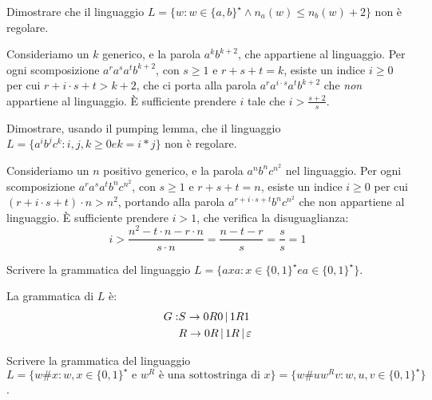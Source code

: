 \begin{esercizio}
Dimostrare che il linguaggio $L = \{ w : w \in \{a,b\}^{\star} \land n_a(w) \le n_b(w) + 2 \}$ non \`e regolare.
\end{esercizio}

Consideriamo un $k$ generico, e la parola $a^k b^{k+2}$, che appartiene al linguaggio.
Per ogni scomposizione $a^r a^s a^t b^{k+2}$, con $s \ge 1$ e $r + s + t = k$, esiste un indice $i \ge 0$ per cui $r + i \cdot s + t > k + 2$, che ci porta alla parola $a^r a^{i \cdot s} a^t b^{k+2}$ che \emph{non} appartiene al linguaggio.
\`E sufficiente prendere $i$ tale che $i > \frac{s + 2}{s}$.

\begin{esercizio}
Dimostrare, usando il pumping lemma, che il linguaggio $L = \{ a^i b^j c^k : i,j,k \ge 0 e k = i * j \}$ non \`e regolare.
\end{esercizio}

Consideriamo un $n$ positivo generico, e la parola $a^n b^n c^{n^2}$ nel linguaggio.
Per ogni scomposizione $a^r a^s a^t b^n c^{n^2}$, con $s \ge 1$ e $r + s + t = n$, esiste un indice $i \ge 0$ per cui $(r + i \cdot s + t) \cdot n > n^2$, portando alla parola $a^{r + i \cdot s + t} b^n c^{n^2}$ che non appartiene al linguaggio.
\`E sufficiente prendere $i > 1$, che verifica la disuguaglianza:
\[
i > \frac{n^2 - t \cdot n - r \cdot n}{s \cdot n} = \frac{n - t - r}{s} = \frac{s}{s} = 1 
\]

\begin{esercizio}
Scrivere la grammatica del linguaggio $L = \{ a x a : x \in \{0,1\}^{\star} e a \in \{0,1\}^{\star} \}$.
\end{esercizio}

La grammatica di $L$ \`e:
\begin{align*}
G :& S \to 0 R 0 \, | \, 1 R 1 \\
& R \to 0R \, | \, 1R \, | \, \varepsilon
\end{align*}

\begin{esercizio}
Scrivere la grammatica del linguaggio $L = \{ w \# x : w, x \in \{0,1\}^{\star} \text{ e } w^R \text{ \`e una sottostringa di } x \} = \{ w \# u w^R v : w, u, v \in \{0,1\}^{\star} \}$.
\end{esercizio}


